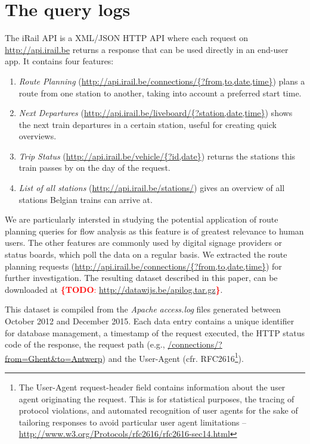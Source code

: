 \documentclass{sig-alternate}
\newcommand{\todo}[1]{\noindent\textcolor{red}{{\bf \{TODO}: #1{\bf \}}}}
\begin{document}
\section{The query logs}
\label{sec:logs}

The iRail API is a XML/JSON HTTP API where each request on \url{http://api.irail.be} returns a response that can be used directly in an end-user app. It contains four features: 
\begin{enumerate}
\item \emph{Route Planning} (\url{http://api.irail.be/connections/{?from,to,date,time}}) plans a route from one station to another, taking into account a preferred start time.
\item \emph{Next Departures} (\url{http://api.irail.be/liveboard/{?station,date,time}}) shows the next train departures in a certain station, useful for creating quick overviews.
\item \emph{Trip Status} (\url{http://api.irail.be/vehicle/{?id,date}}) returns the stations this train passes by on the day of the request.
\item \emph{List of all stations} (\url{http://api.irail.be/stations/}) gives an overview of all stations Belgian trains can arrive at.
\end{enumerate}

We are particularly intersted in studying the potential application of route planning queries for flow analysis as this feature is of greatest relevance to human users.
The other features are commonly used by digital signage providers or status boards, which poll the data on a regular basis.
We extracted the route planning requests (\url{http://api.irail.be/connections/{?from,to,date,time}}) for further investigation.
The resulting dataset described in this paper, can be downloaded at \todo{\url{http://datawijs.be/apilog.tar.gz}}.

This dataset is compiled from the \emph{Apache} \emph{access.log} files generated between October 2012 and December 2015. 
Each data entry contains a unique identifier for database management, a timestamp of the request  executed, the HTTP status code of the response, the request path (e.g., \url{/connections/?from=Ghent\&to=Antwerp}) and the User-Agent (cfr. RFC2616\footnote{The User-Agent request-header field contains information about the user agent originating the request. 
This is for statistical purposes, the tracing of protocol violations, and automated recognition of user agents for the sake of tailoring responses to avoid particular user agent limitations -- \url{http://www.w3.org/Protocols/rfc2616/rfc2616-sec14.html}}).
\end{document}

